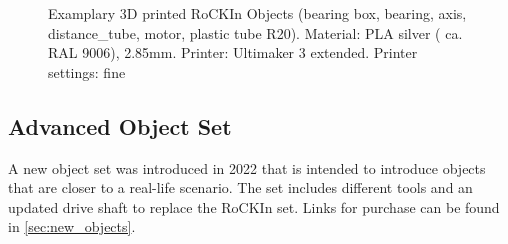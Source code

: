 \begin{figure}[h!]
	\begin{center}
		\vspace{0.05\textwidth}
	\end{center}
	\caption{Examplary 3D printed RoCKIn Objects (bearing box, bearing, axis, distance\_tube, motor, plastic tube R20). Material:  PLA silver ( ca. RAL 9006), 2.85mm. Printer: Ultimaker 3 extended. Printer settings: fine}
	\label{fig:RoCKIn_printed}
\end{figure}



\clearpage
\subsection{Advanced Object Set}


A new object set was introduced in 2022 that is intended to introduce objects that are closer to a real-life scenario. The set includes different tools and an updated drive shaft to replace the RoCKIn set. Links for purchase can be found in \ref{sec:new_objects}.

